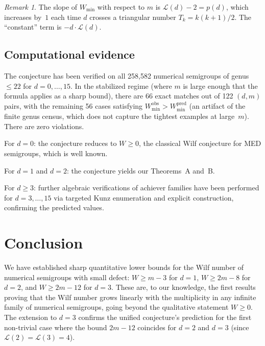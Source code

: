 \documentclass[11pt]{amsart}
\theoremstyle{definition}
\theoremstyle{remark}
\newtheorem{remark}[theorem]{Remark}
\begin{document}
\begin{remark}
The slope of $W_{\min}$ with respect to $m$ is
$\mathcal{L}(d) - 2 = p(d)$, which increases by~$1$ each time $d$ crosses
a triangular number $T_k = k(k+1)/2$.  The ``constant'' term is
$-d \cdot \mathcal{L}(d)$.
\end{remark}

\subsection{Computational evidence}

The conjecture has been verified on all 258{,}582 numerical semigroups
of genus $\le 22$ for $d = 0, \ldots, 15$.
In the stabilized regime (where $m$ is large enough that the formula
applies as a sharp bound), there are 66 exact matches out of 122
$(d, m)$ pairs, with the remaining 56 cases satisfying $W_{\min}^{\text{obs}}
> W_{\min}^{\text{pred}}$ (an artifact of the finite genus census, which
does not capture the tightest examples at large~$m$).
There are zero violations.

For $d = 0$: the conjecture reduces to $W \ge 0$, the classical Wilf conjecture
for MED semigroups, which is well known.

For $d = 1$ and $d = 2$: the conjecture yields our Theorems~A and~B.

For $d \ge 3$: further algebraic verifications of achiever families have been
performed for $d = 3, \ldots, 15$ via targeted Kunz enumeration and
explicit construction, confirming the predicted values.

\section{Conclusion}\label{sec:conclusion}

We have established sharp quantitative lower bounds for the Wilf number
of numerical semigroups with small defect:
$W \ge m - 3$ for $d = 1$, $W \ge 2m - 8$ for $d = 2$,
and $W \ge 2m - 12$ for $d = 3$.
These are, to our knowledge, the first results proving that the Wilf number
grows linearly with the multiplicity in any infinite family of numerical
semigroups, going beyond the qualitative statement $W \ge 0$.
The extension to $d = 3$ confirms the unified conjecture's prediction
for the first non-trivial case where the bound $2m - 12$ coincides for
$d = 2$ and $d = 3$ (since $\mathcal{L}(2) = \mathcal{L}(3) = 4$).
\end{document}
